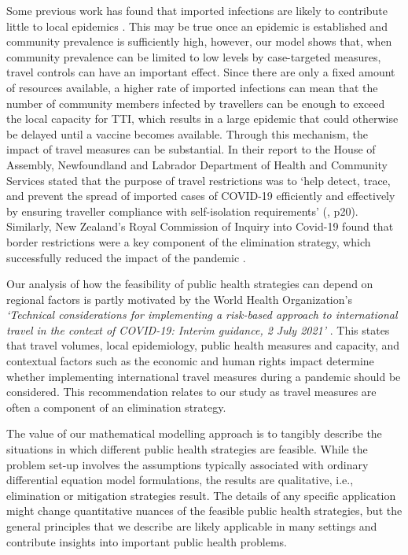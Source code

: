 \documentclass[pdflatex]{sn-jnl}
\theoremstyle{thmstyleone}%
\theoremstyle{thmstyletwo}%
\theoremstyle{thmstylethree}%
\begin{document}
Some previous work has found that imported infections are likely to contribute little to local epidemics \citep{russell_effect_2021, hollingsworth_will_2006, gumel_modelling_2004, arino_risk_2021, chinazzi_effect_2020, wells_impact_2020}. This may be true once an epidemic is established and community prevalence is sufficiently high, however, our model shows that, when community prevalence can be limited to low levels by case-targeted measures, travel controls can have an important effect. Since there are only a fixed amount of resources available, a higher rate of imported infections can mean that the number of community members infected by travellers can be enough to exceed the local capacity for TTI, which results in a large epidemic that could otherwise be delayed until a vaccine becomes available. Through this mechanism, the impact of travel measures can be substantial. In their report to the House of Assembly, Newfoundland and Labrador Department of Health and Community Services stated that the purpose of travel restrictions was to `help detect, trace, and prevent the spread of imported cases of COVID-19 efficiently and effectively by ensuring traveller compliance with self-isolation requirements' (\citealt{HOA}, p20). Similarly, New Zealand's Royal Commission of Inquiry into Covid-19 found that border restrictions were a key component of the elimination strategy, which successfully reduced the impact of the pandemic \citep{NZRCOI_phase1,NZRCOI_phase2}. 

Our analysis of how the feasibility of public health strategies can depend on regional factors is partly motivated by the World Health Organization's \emph{`Technical considerations for implementing a risk-based approach to international travel in the context of COVID-19: Interim guidance, 2 July 2021'} \citep{who_technical_nodate}. This states that travel volumes, local epidemiology, public health measures and capacity, and contextual factors such as the economic and human rights impact determine whether implementing international travel measures during a pandemic should be considered. This recommendation relates to our study as travel measures are often a component of an elimination strategy.

The value of our mathematical modelling approach is to tangibly describe the situations in which different public health strategies are feasible. While the problem set-up involves the assumptions typically associated with ordinary differential equation model formulations, the results are qualitative, i.e., elimination or mitigation strategies result. The details of any specific application might change quantitative nuances of the feasible public health strategies, but the general principles that we describe are likely applicable in many settings and contribute insights into important public health problems.
\end{document}
